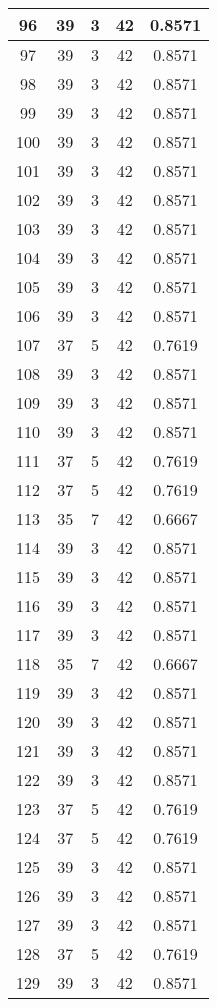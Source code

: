 \documentclass[letterpaper, 12pt]{article}
\begin{document}
\begin{longtable}{|c|c|c|c|c|}
\hline
96 & 39 & 3 & 42 & 0.8571 \\
\hline
97 & 39 & 3 & 42 & 0.8571 \\
\hline
98 & 39 & 3 & 42 & 0.8571 \\
\hline
99 & 39 & 3 & 42 & 0.8571 \\
\hline
100 & 39 & 3 & 42 & 0.8571 \\
\hline
101 & 39 & 3 & 42 & 0.8571 \\
\hline
102 & 39 & 3 & 42 & 0.8571 \\
\hline
103 & 39 & 3 & 42 & 0.8571 \\
\hline
104 & 39 & 3 & 42 & 0.8571 \\
\hline
105 & 39 & 3 & 42 & 0.8571 \\
\hline
106 & 39 & 3 & 42 & 0.8571 \\
\hline
107 & 37 & 5 & 42 & 0.7619 \\
\hline
108 & 39 & 3 & 42 & 0.8571 \\
\hline
109 & 39 & 3 & 42 & 0.8571 \\
\hline
110 & 39 & 3 & 42 & 0.8571 \\
\hline
111 & 37 & 5 & 42 & 0.7619 \\
\hline
112 & 37 & 5 & 42 & 0.7619 \\
\hline
113 & 35 & 7 & 42 & 0.6667 \\
\hline
114 & 39 & 3 & 42 & 0.8571 \\
\hline
115 & 39 & 3 & 42 & 0.8571 \\
\hline
116 & 39 & 3 & 42 & 0.8571 \\
\hline
117 & 39 & 3 & 42 & 0.8571 \\
\hline
118 & 35 & 7 & 42 & 0.6667 \\
\hline
119 & 39 & 3 & 42 & 0.8571 \\
\hline
120 & 39 & 3 & 42 & 0.8571 \\
\hline
121 & 39 & 3 & 42 & 0.8571 \\
\hline
122 & 39 & 3 & 42 & 0.8571 \\
\hline
123 & 37 & 5 & 42 & 0.7619 \\
\hline
124 & 37 & 5 & 42 & 0.7619 \\
\hline
125 & 39 & 3 & 42 & 0.8571 \\
\hline
126 & 39 & 3 & 42 & 0.8571 \\
\hline
127 & 39 & 3 & 42 & 0.8571 \\
\hline
128 & 37 & 5 & 42 & 0.7619 \\
\hline
129 & 39 & 3 & 42 & 0.8571 \\

\end{longtable}
\end{document}
